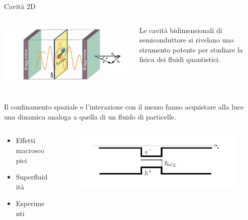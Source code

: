 \documentclass[10pt]{beamer}
\begin{document}
 \begin{frame}{Cavità 2D}
 \transwipe[direction=270]
 \small

\begin{minipage}{\textwidth}
  \begin{columns}
  
  \begin{column}{.6\textwidth}
    \includegraphics[width=\columnwidth]{files/QW_color.png}
  \end{column}

  \begin{column}{.4\textwidth}
    Le cavità bidimensionali di semiconduttore si rivelano uno strumento potente per studiare la fisica dei fluidi quantistici.
    \end{column}
  \end{columns}
  \end{minipage}
  
  Il confinamento spaziale e l'interazione con il mezzo fanno acquistare alla luce una dinamica analoga a quella di un fluido di particelle.
  
  \begin{minipage}{\textwidth}
  \begin{columns}
  
  \begin{column}{.3\textwidth}
    \begin{itemize}
     \item Effetti macroscopici
     \item Superfluidità
     \item Esperimenti
    \end{itemize}

  \end{column}
\hfill
  \begin{column}{.5\textwidth}
  \begin{figure}
    \includegraphics[width=\columnwidth]{files/QW.jpg}
  \end{figure}
    \end{column}
  \end{columns}
  \end{minipage}
  

\end{frame}
\end{document}
